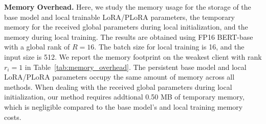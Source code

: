 \documentclass{article} %
\begin{document}


\begin{table}[h]

\centering
\renewcommand{\arraystretch}{1.25}
\caption{{Memory overhead of Fed-PLoRA compared with SOTA methods.}}
\label{tab:memory_overhead}
\end{table}

\noindent\textbf{Memory Overhead.} { Here, we study the memory usage for the storage of the base model and local trainable LoRA/PLoRA parameters, the temporary memory for the received global parameters during local initialization, and the memory during local training. The results are obtained using FP16 BERT-base~\cite{devlin2019bert} with a global rank of $R{=}16$. The batch size for local training is 16, and the input size is 512. We report the memory footprint on the weakest client with rank $r_i=1$ in Table~\ref{tab:memory_overhead}. The persistent base model and local LoRA/PLoRA parameters occupy the same amount of memory across all methods. When dealing with the received global parameters during local initialization, our method requires addtional 0.50 MB of temporary memory, which is negligible compared to the base model’s and local training memory costs.}
\end{document}
